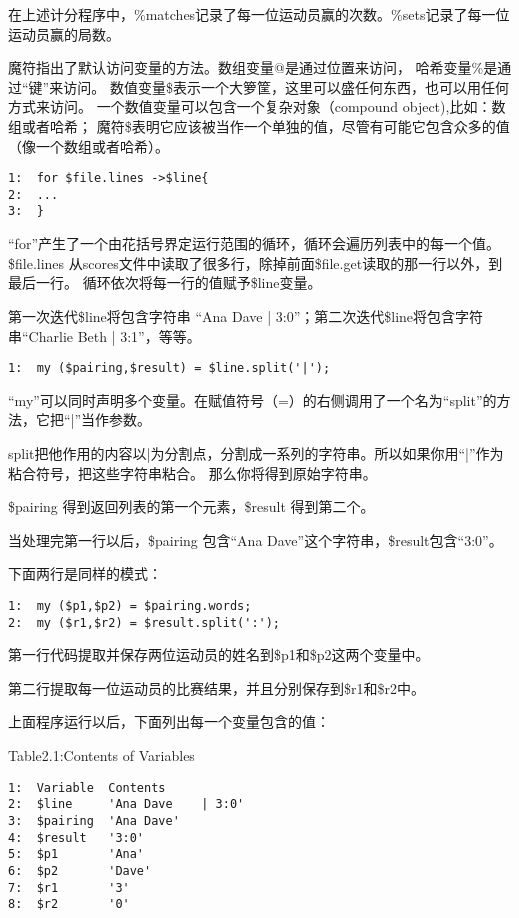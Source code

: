 \documentclass[11pt]{ctexart}
\begin{document}
在上述计分程序中，\%matches记录了每一位运动员赢的次数。\%sets记录了每一位运动员赢的局数。

魔符指出了默认访问变量的方法。数组变量@是通过位置来访问，
哈希变量\%是通过“键”来访问。
数值变量\$表示一个大箩筐，这里可以盛任何东西，也可以用任何方式来访问。
一个数值变量可以包含一个复杂对象（compound object),比如：数组或者哈希；
魔符\$表明它应该被当作一个单独的值，尽管有可能它包含众多的值（像一个数组或者哈希）。

\begin{verbatim}
1:  for $file.lines ->$line{
2:  ...
3:  }
\end{verbatim}
“for”产生了一个由花括号界定运行范围的循环，循环会遍历列表中的每一个值。
\$file.lines 从scores文件中读取了很多行，除掉前面\$file.get读取的那一行以外，到最后一行。
循环依次将每一行的值赋予\$line变量。

第一次迭代\$line将包含字符串 “Ana Dave | 3:0”；第二次迭代\$line将包含字符串“Charlie Beth | 3:1”，等等。


\begin{verbatim}
1:  my ($pairing,$result) = $line.split('|');
\end{verbatim}
“my”可以同时声明多个变量。在赋值符号（=）的右侧调用了一个名为“split”的方法，它把“|”当作参数。

split把他作用的内容以|为分割点，分割成一系列的字符串。所以如果你用“|”作为粘合符号，把这些字符串粘合。
那么你将得到原始字符串。

\$pairing 得到返回列表的第一个元素，\$result 得到第二个。

当处理完第一行以后，\$pairing 包含“Ana Dave”这个字符串，\$result包含“3:0”。

下面两行是同样的模式：

\begin{verbatim}
1:  my ($p1,$p2) = $pairing.words;
2:  my ($r1,$r2) = $result.split(':');
\end{verbatim}
第一行代码提取并保存两位运动员的姓名到\$p1和\$p2这两个变量中。

第二行提取每一位运动员的比赛结果，并且分别保存到\$r1和\$r2中。

上面程序运行以后，下面列出每一个变量包含的值：


Table2.1:Contents of Variables

\begin{verbatim}
1:  Variable  Contents               
2:  $line     'Ana Dave    | 3:0' 
3:  $pairing  'Ana Dave'              
4:  $result   '3:0'                   
5:  $p1       'Ana'                   
6:  $p2       'Dave'                  
7:  $r1       '3'                     
8:  $r2       '0'
\end{verbatim}
\end{document}
